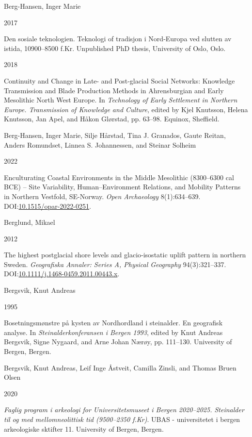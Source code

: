 \documentclass[
  12pt,
  a4paper,
  oneside]{book}
\newlength{\cslhangindent}
\newlength{\csllabelwidth}
\newlength{\cslentryspacingunit} %
\newenvironment{CSLReferences}[2] %
 {%
  \setlength{\parindent}{0pt}
  \ifodd #1
  \let\oldpar\par
  \def\par{\hangindent=\cslhangindent\oldpar}
  \fi
  \setlength{\parskip}{#2\cslentryspacingunit}
 }%
 {}
\newcommand{\CSLBlock}[1]{#1\hfill\break}
\newcommand{\CSLLeftMargin}[1]{\parbox[t]{\csllabelwidth}{#1}}
\newcommand{\CSLRightInline}[1]{\parbox[t]{\linewidth - \csllabelwidth}{#1}\break}
\begin{document}
\begin{CSLReferences}{0}{0}
\leavevmode{}%
\CSLBlock{Berg-Hansen, Inger Marie}
\CSLLeftMargin{ 2017}%
\CSLRightInline{{Den sosiale teknologien. Teknologi of tradisjon i Nord-Europa ved slutten av istida, 10900--8500 f.Kr}. Unpublished PhD thesis, University of Oslo, Oslo.}

\leavevmode{}%
\CSLLeftMargin{ 2018 }%
\CSLRightInline{{Continuity and Change in Late- and Post-glacial Social Networks: Knowledge Transmission and Blade Production Methods in Ahrensburgian and Early Mesolithic North West Europe}. In \emph{{Technology of Early Settlement in Northern Europe. Transmission of Knowledge and Culture}}, edited by Kjel Knutsson, Helena Knutsson, Jan Apel, and Håkon Glørstad, pp. 63--98. Equinox, Sheffield.}

\leavevmode{}%
\CSLBlock{Berg-Hansen, Inger Marie, Silje Hårstad, Tina J. Granados, Gaute Reitan, Anders Romundset, Linnea S. Johannessen, and Steinar Solheim}
\CSLLeftMargin{ 2022}%
\CSLRightInline{{Enculturating Coastal Environments in the Middle Mesolithic (8300--6300 cal BCE) -- Site Variability, Human--Environment Relations, and Mobility Patterns in Northern Vestfold, SE-Norway}. \emph{Open Archaeology} 8(1):634--639. DOI:\href{https://doi.org/10.1515/opar-2022-0251}{10.1515/opar-2022-0251}.}

\leavevmode{}%
\CSLBlock{Berglund, Mikael}
\CSLLeftMargin{ 2012}%
\CSLRightInline{{The highest postglacial shore levels and glacio‐isostatic uplift pattern in northern Sweden}. \emph{Geografiska Annaler: Series A, Physical Geography} 94(3):321--337. DOI:\href{https://doi.org/10.1111/j.1468-0459.2011.00443.x}{10.1111/j.1468-0459.2011.00443.x}.}

\leavevmode{}%
\CSLBlock{Bergsvik, Knut Andreas}
\CSLLeftMargin{ 1995}%
\CSLRightInline{{Bosetningsmønstre på kysten av Nordhordland i steinalder. En geografisk analyse}. In \emph{{Steinalderkonferansen i Bergen 1993}}, edited by Knut Andreas Bergsvik, Signe Nygaard, and Arne Johan Nærøy, pp. 111--130. University of Bergen, Bergen.}

\leavevmode{}%
\CSLBlock{Bergsvik, Knut Andreas, Leif Inge Åstveit, Camilla Zinsli, and Thomas Bruen Olsen}
\CSLLeftMargin{ 2020}%
\CSLRightInline{\emph{{Faglig program i arkeologi for Universitetsmuseet i Bergen 2020--2025. Steinalder til og med mellomneolittisk tid (9500--2350 f.Kr)}}. UBAS - universitetet i bergen arkeologiske sktifter 11. University of Bergen, Bergen.}


\end{CSLReferences}
\end{document}
